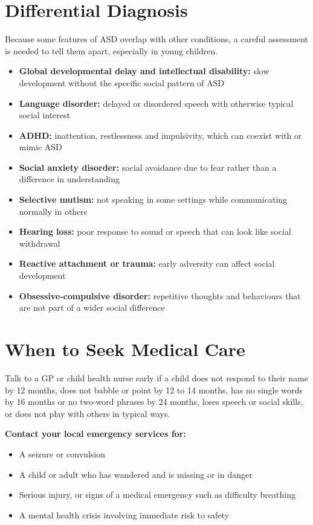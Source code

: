 \section*{Differential Diagnosis}
Because some features of ASD overlap with other conditions, a careful assessment is needed to tell them apart, especially in young children.

\begin{itemize}
    \item \textbf{Global developmental delay and intellectual disability:} slow development without the specific social pattern of ASD
    \item \textbf{Language disorder:} delayed or disordered speech with otherwise typical social interest
    \item \textbf{ADHD:} inattention, restlessness and impulsivity, which can coexist with or mimic ASD
    \item \textbf{Social anxiety disorder:} social avoidance due to fear rather than a difference in understanding
    \item \textbf{Selective mutism:} not speaking in some settings while communicating normally in others
    \item \textbf{Hearing loss:} poor response to sound or speech that can look like social withdrawal
    \item \textbf{Reactive attachment or trauma:} early adversity can affect social development
    \item \textbf{Obsessive-compulsive disorder:} repetitive thoughts and behaviours that are not part of a wider social difference
\end{itemize}

\section*{When to Seek Medical Care}
Talk to a GP or child health nurse early if a child does not respond to their name by 12 months, does not babble or point by 12 to 14 months, has no single words by 16 months or no two-word phrases by 24 months, loses speech or social skills, or does not play with others in typical ways.

\textbf{Contact your local emergency services for:}
\begin{itemize}
    \item A seizure or convulsion
    \item A child or adult who has wandered and is missing or in danger
    \item Serious injury, or signs of a medical emergency such as difficulty breathing
    \item A mental health crisis involving immediate risk to safety
\end{itemize}

